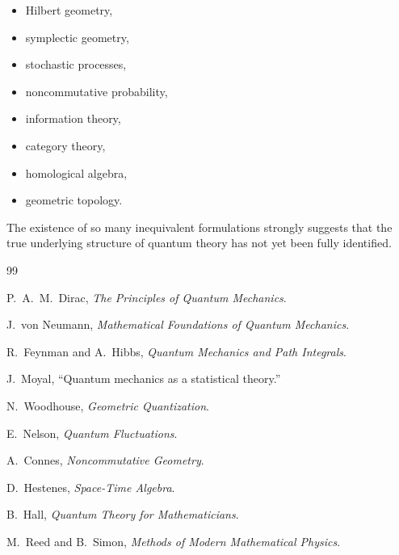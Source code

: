 \documentclass[11pt]{book}
\begin{document}
\begin{itemize}
\item Hilbert geometry,
\item symplectic geometry,
\item stochastic processes,
\item noncommutative probability,
\item information theory,
\item category theory,
\item homological algebra,
\item geometric topology.
\end{itemize}

The existence of so many inequivalent formulations strongly suggests that the true underlying structure of quantum theory has not yet been fully identified.



\begin{thebibliography}{99}

P.~A.~M.~Dirac,
\textit{The Principles of Quantum Mechanics}.

J.~von Neumann,
\textit{Mathematical Foundations of Quantum Mechanics}.

R.~Feynman and A.~Hibbs,
\textit{Quantum Mechanics and Path Integrals}.

J.~Moyal,
``Quantum mechanics as a statistical theory.''

N.~Woodhouse,
\textit{Geometric Quantization}.

E.~Nelson,
\textit{Quantum Fluctuations}.

A.~Connes,
\textit{Noncommutative Geometry}.

D.~Hestenes,
\textit{Space-Time Algebra}.

B.~Hall,
\textit{Quantum Theory for Mathematicians}.

M.~Reed and B.~Simon,
\textit{Methods of Modern Mathematical Physics}.

\end{thebibliography}
\end{document}
